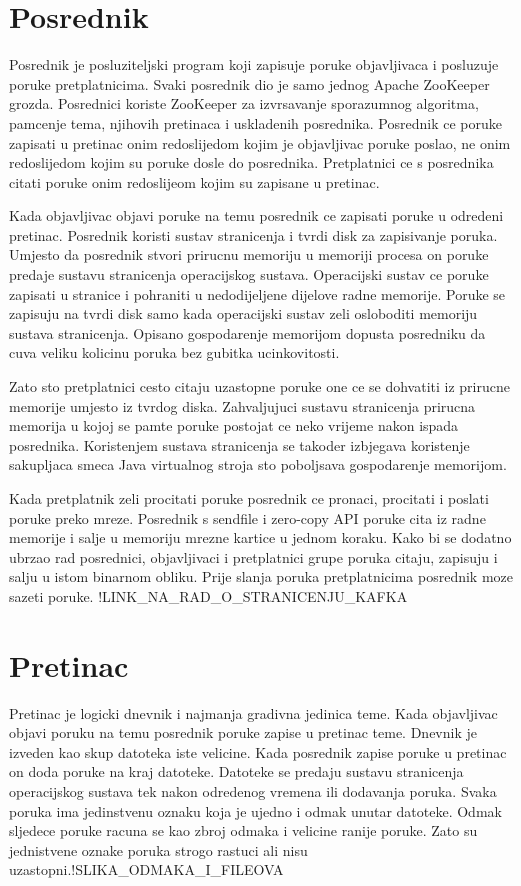\documentclass[times, utf8, diplomski, numeric]{fer}
\begin{document}
\chapter{Posrednik}
Posrednik je posluziteljski program koji zapisuje poruke objavljivaca i posluzuje poruke pretplatnicima. Svaki posrednik dio je samo jednog Apache ZooKeeper grozda. Posrednici koriste ZooKeeper za izvrsavanje sporazumnog algoritma, pamcenje tema, njihovih pretinaca i uskladenih posrednika. Posrednik ce poruke zapisati u pretinac onim redoslijedom kojim je objavljivac poruke poslao, ne onim redoslijedom kojim su poruke dosle do posrednika. Pretplatnici ce s posrednika citati poruke onim redoslijeom kojim su zapisane u pretinac.

Kada objavljivac objavi poruke na temu posrednik ce zapisati poruke u odredeni pretinac. Posrednik koristi sustav stranicenja i tvrdi disk za zapisivanje poruka. Umjesto da posrednik stvori prirucnu memoriju u memoriji procesa on poruke predaje sustavu stranicenja operacijskog sustava. Operacijski sustav ce poruke zapisati u stranice i pohraniti u nedodijeljene dijelove radne memorije. Poruke se zapisuju na tvrdi disk samo kada operacijski sustav zeli osloboditi memoriju sustava stranicenja. Opisano gospodarenje memorijom dopusta posredniku da cuva veliku kolicinu poruka bez gubitka ucinkovitosti.

Zato sto pretplatnici cesto citaju uzastopne poruke one ce se dohvatiti iz prirucne memorije umjesto iz tvrdog diska. Zahvaljujuci sustavu stranicenja prirucna memorija u kojoj se pamte poruke postojat ce neko vrijeme nakon ispada posrednika. Koristenjem sustava stranicenja se takoder izbjegava koristenje sakupljaca smeca Java virtualnog stroja sto poboljsava gospodarenje memorijom.

Kada pretplatnik zeli procitati poruke posrednik ce pronaci, procitati i poslati poruke preko mreze. Posrednik s sendfile i zero-copy API poruke cita iz radne memorije i salje u memoriju mrezne kartice u jednom koraku. Kako bi se dodatno ubrzao rad posrednici, objavljivaci i pretplatnici grupe poruka citaju, zapisuju i salju u istom binarnom obliku. Prije slanja poruka pretplatnicima posrednik moze sazeti poruke. !LINK_NA_RAD_O_STRANICENJU_KAFKA 



\chapter{Pretinac}
Pretinac je logicki dnevnik i najmanja gradivna jedinica teme. Kada objavljivac objavi poruku na temu posrednik poruke zapise u pretinac teme. Dnevnik je izveden kao skup datoteka iste velicine. Kada posrednik zapise poruke u pretinac on doda poruke na kraj datoteke. Datoteke se predaju sustavu stranicenja operacijskog sustava tek nakon odredenog vremena ili dodavanja poruka. Svaka poruka ima jedinstvenu oznaku koja je ujedno i odmak unutar datoteke. Odmak sljedece poruke racuna se kao zbroj odmaka i velicine ranije poruke. Zato su jednistvene oznake poruka strogo rastuci ali nisu uzastopni.!SLIKA_ODMAKA_I_FILEOVA
\end{document}
